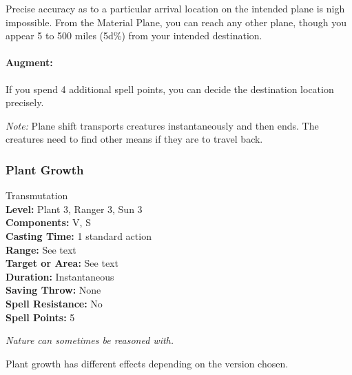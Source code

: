 Precise accuracy as to a particular arrival location on the intended plane is nigh impossible. 
From the Material Plane, you can reach any other plane, though you appear 5 to 500 miles (5d\%) from your intended destination.

\paragraph{Augment:} If you spend 4 additional spell points, you can decide the destination location precisely.

\emph{Note:} Plane shift transports creatures instantaneously and then ends. The creatures need to find other means if they are to travel back. 
\subsubsection{Plant Growth}
\label{Spell:PlantGrowth}
Transmutation
\\ \textbf{Level:} Plant 3, Ranger 3, Sun 3
\\ \textbf{Components:} V, S
\\ \textbf{Casting Time:} 1 standard action
\\ \textbf{Range:} See text
\\ \textbf{Target or Area:} See text
\\ \textbf{Duration:} Instantaneous
\\ \textbf{Saving Throw:} None
\\ \textbf{Spell Resistance:} No
\\ \textbf{Spell Points:} 5

\emph{Nature can sometimes be reasoned with.}

Plant growth has different effects depending on the version chosen.

